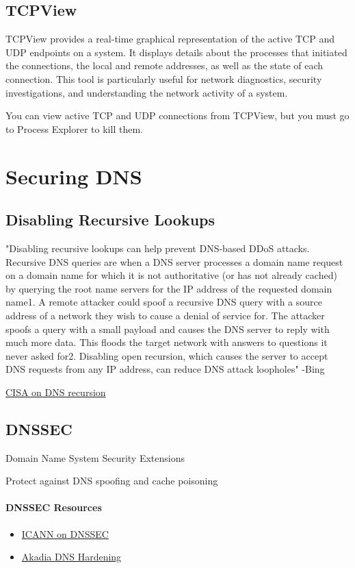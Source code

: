 \documentclass{article}
\begin{document}
\subsection{TCPView}
TCPView provides a real-time graphical representation of the active TCP and UDP endpoints on a system. 
It displays details about the processes that initiated the connections, 
the local and remote addresses, as well as the state of each connection. 
This tool is particularly useful for network diagnostics, security investigations, 
and understanding the network activity of a system.

You can view active TCP and UDP connections from TCPView, but you must go to
Process Explorer to kill them.

\section{Securing DNS}

\subsection{Disabling Recursive Lookups}
"Disabling recursive lookups can help prevent DNS-based DDoS attacks. 
Recursive DNS queries are when a DNS server processes a domain name 
request on a domain name for which it is not authoritative 
(or has not already cached) by querying the root name servers for 
the IP address of the requested domain name1. A remote attacker could 
spoof a recursive DNS query with a source address of a network they 
wish to cause a denial of service for. The attacker spoofs a query 
with a small payload and causes the DNS server to reply with much 
more data. This floods the target network with answers to questions 
it never asked for2. Disabling open recursion, which causes the server 
to accept DNS 
requests from any IP address, can reduce DNS attack loopholes" -Bing

\href{https://www.cisa.gov/sites/default/files/publications/DNS-recursion033006.pdf}{CISA on DNS recursion}

\subsection{DNSSEC}
Domain Name System Security Extensions

Protect against DNS spoofing and cache poisoning

\paragraph{DNSSEC Resources}
\begin{itemize}
\item \href{https://www.icann.org/resources/pages/dnssec-what-is-it-why-important-2019-03-05-en}{ICANN on DNSSEC}
\item \href{https://www.akadia.com/services/dns_hardening.html}{Akadia DNS Hardening}
\end{itemize}
\end{document}
